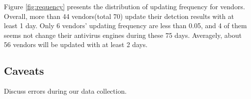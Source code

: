

Figure \ref{fig:requency} presents the distribution of updating frequency for vendors. Overall, more than 44 vendors(total 70) update their detction results with at least 1 day. Only 6 vendors' updating frequency are less than 0.05, and 4 of them seems not change their antivirus engines during these 75 days. Averagely, about 56 vendors will be updated with at least 2 days. 

\subsection{Caveats}

Discuss errors during our data collection. 
